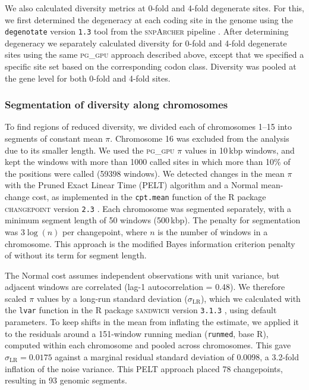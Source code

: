 We also calculated diversity metrics at 0-fold and 4-fold degenerate sites.
For this, we first determined the degeneracy at each coding site in the genome using the
\texttt{degenotate} version \texttt{1.3} tool from the \textsc{snpArcher} pipeline
\citep{mirchandani_snparcher_2023}.
After determining degeneracy we separately calculated diversity for 0-fold and 4-fold
degenerate sites using the same \textsc{pg\_gpu} approach described above, except that we
specified a specific site set based on the corresponding codon class.
Diversity was pooled at the gene level for both 0-fold and 4-fold sites.

\subsubsection*{Segmentation of diversity along chromosomes}\label{sec:methods_segments}

To find regions of reduced diversity, we divided each of
chromosomes 1--15 into segments of constant mean $\pi$.
Chromosome 16 was excluded from the analysis due to its smaller length.
We used the \textsc{pg\_gpu} $\pi$ values in 10\,kbp windows, and kept the windows with
more than \num{1000} called sites in which more than 10\% of the positions were called
(\num{59398} windows).
We detected changes in the mean $\pi$ with the Pruned Exact Linear Time (PELT)
algorithm \citep{killick_optimal_2012} and a Normal mean-change cost, as implemented in
the \texttt{cpt.mean} function of the \textsc{R} package \textsc{changepoint} version
\texttt{2.3} \citep{killick_changepoint_2014}.
Each chromosome was segmented separately, with a minimum segment length of 50 windows
(500\,kbp).
The penalty for segmentation was $3\log(n)$ per changepoint, where $n$
is the number of windows in a chromosome.
This approach is the modified Bayes information criterion penalty of
\citet{zhang_modified_2007} without its term for segment length.
\vspace{0.1cm}

The Normal cost assumes independent observations with unit variance, but adjacent
windows are correlated (lag-1 autocorrelation = 0.48).
We therefore scaled $\pi$ values by a long-run standard deviation ($\sigma_\text{LR}$),
which we calculated with the \texttt{lvar} function in the \textsc{R} package
\textsc{sandwich} version \texttt{3.1.3} \citep{zeileis_2004_sandwhich}, using
default parameters.
To keep shifts in the mean from inflating the estimate, we applied it to the residuals
around a 151-window running median (\texttt{runmed}, base \textsc{R}), computed within
each chromosome and pooled across chromosomes.
This gave $\sigma_\text{LR} = 0.0175$ against a marginal residual standard deviation of
0.0098, a 3.2-fold inflation of the noise variance.
This PELT approach placed 78 changepoints, resulting in 93 genomic segments.
\vspace{0.1cm}

